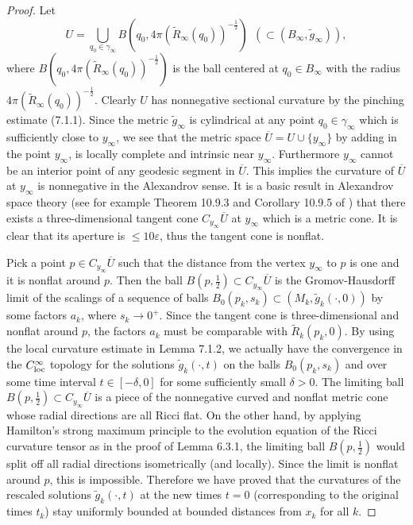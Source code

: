 \begin{proof}
Let
$$
U=\bigcup\limits_{q_0\in
\gamma_{\infty}}B(q_0,4\pi(\tilde{R}_{\infty}(q_0))^{-\frac{1}{2}})\
\ (\subset (B_{\infty}, \tilde{g}_{\infty})),
$$
where $B(q_0,4\pi(\tilde{R}_{\infty}(q_0))^{-\frac{1}{2}})$ is the
ball centered at $q_0\in B_{\infty}$ with the radius
$4\pi(\tilde{R}_{\infty}(q_0))^{-\frac{1}{2}}$. Clearly $U$ has
nonnegative sectional curvature by the pinching estimate (7.1.1).
Since the metric $\tilde{g}_{\infty}$ is cylindrical at any point
$q_0\in \gamma_{\infty}$ which is sufficiently close to
$y_{\infty}$, we see that the metric space $\overline{U}=U\cup
\{y_{\infty}\}$ by adding in the point $y_{\infty}$, is locally
complete and intrinsic near $y_{\infty}$. Furthermore $y_{\infty}$
cannot be an interior point of any geodesic segment in
$\overline{U}$. This implies the curvature of $\overline{U}$ at
$y_{\infty}$ is nonnegative in the Alexandrov sense. It is a basic
result in Alexandrov space theory (see for example Theorem 10.9.3
and Corollary 10.9.5 of \cite{BBI}) that there exists a
three-dimensional tangent cone $C_{y_{\infty}}\overline{U}$ at
$y_{\infty}$ which is a metric cone. It is clear that its aperture
is $\leq 10\varepsilon$, thus the tangent cone is nonflat.

Pick a point $p\in C_{y_{\infty}}\overline{U}$ such that the
distance from the vertex $y_{\infty}$ to $p$ is one and it is
nonflat around $p$. Then the ball $B(p,\frac{1}{2})\subset
C_{y_{\infty}}\overline{U}$ is the Gromov-Hausdorff limit of the
scalings of a sequence of balls
$B_0(p_k,s_k)\subset(M_k,\tilde{g}_{k}(\cdot,0))$ by some factors
$a_k$, where $s_k\rightarrow 0^+$. Since the tangent cone is
three-dimensional and nonflat around $p$, the factors $a_k$ must
be comparable with $\tilde{R}_k(p_k,0)$. By using the local
curvature estimate in Lemma 7.1.2, we actually have the
convergence in the $C^{\infty}_{\rm loc}$ topology for the
solutions $\tilde{g}_{k}(\cdot,t)$ on the balls $B_0(p_k,s_k)$ and
over some time interval $t\in [-\delta, 0]$ for some sufficiently
small $\delta>0$. The limiting ball $B(p,\frac{1}{2})\subset
C_{y_{\infty}}\overline{U}$ is a piece of the nonnegative curved
and nonflat metric cone whose radial directions are all Ricci
flat. On the other hand, by applying Hamilton's strong maximum
principle to the evolution equation of the Ricci curvature tensor
as in the proof of Lemma 6.3.1, the limiting ball
$B(p,\frac{1}{2})$ would split off all radial directions
isometrically (and locally). Since the limit is nonflat around
$p$, this is impossible. Therefore we have proved that the
curvatures of the rescaled solutions $\tilde{g}_k(\cdot,t)$ at the
new times $t=0$ (corresponding to the original times $t_k$) stay
uniformly bounded at bounded distances from $x_k$ for all $k$.


\end{proof}
